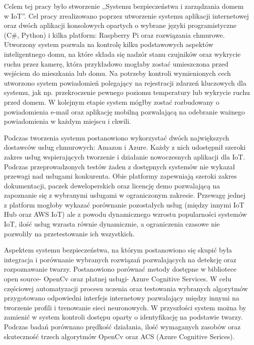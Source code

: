 Celem tej pracy było stworzenie ,,Systemu bezpieczeństwa i zarządzania domem w IoT''. Cel pracy zrealizowano poprzez utworzenie systemu aplikacji internetowej oraz dwóch aplikacji konsolowych opartych o wybrane języki programistyczne (C#, Python) i kilka platform: Raspberry Pi oraz rozwiązania chmurowe.
Utworzony system pozwala na kontrolę kilku podstawowych aspektów inteligentnego domu, na które składa się nadzór stanu czujników oraz wykrycie ruchu przez kamerę, która przykładowo mogłaby zostać umieszczona przed wejściem do mieszkania lub domu.
Na potrzeby kontroli wymienionych cech utworzono system powiadomień polegający na rejestracji zdarzeń kluczowych dla systemu, jak np. przekroczenie pewnego poziomu temperatury lub wykrycie ruchu przed domem. W kolejnym etapie system mógłby zostać rozbudowany o powiadomienia e-mail oraz aplikację mobilną pozwalającą na odebranie ważnego powiadomienia w każdym miejscu i chwili.

Podczas tworzenia systemu postanowiono wykorzystać dwóch największych dostawców usług chmurowych: Amazon i Azure. Każdy z nich udostępnił szeroki zakres usług wspierających tworzenie i działanie nowoczesnych aplikacji dla IoT. Podczas przeprowadzonych testów żaden z dostępnych systemów nie wykazał przewagi nad usługami konkurenta. Obie platformy zapewniają szeroki zakres dokumentacji, paczek deweloperskich oraz licencję demo pozwalającą na zapoznanie się z wybranymi usługami w ograniczonym zakresie. Przewagę jednej z platform mogłoby wykazać porównanie pozostałych usług (między innymi IoT Hub oraz AWS IoT) ale z powodu dynamicznego wzrostu popularności systemów IoT, ilość usług wzrasta równie dynamicznie, a ograniczenia czasowe nie pozwoliły na przetestowanie ich wszystkich.

Aspektem systemu bezpieczeństwa, na którym postanowiono się skupić była integracja i porównanie wybranych rozwiązań pozwalających na detekcję oraz rozpoznawanie twarzy. Postanowiono porównać metody dostępne w bibliotece open source- OpenCv oraz płatnej usługi- Azure Cognitive Services. W celu częściowej automatyzacji procesu uczenia oraz testowania wybranych algorytmów przygotowano odpowiedni interfejs internetowy pozwalający między innymi na tworzenie profili i trenowanie sieci neuronowych. W przyszłości system można by zamienić w system kontroli dostępu oparty o identyfikację na podstawie twarzy. Podczas badań porównano prędkość działania, ilość wymaganych zasobów oraz skuteczność trzech algorytmów OpenCv oraz ACS (Azure Cognitive Serices).